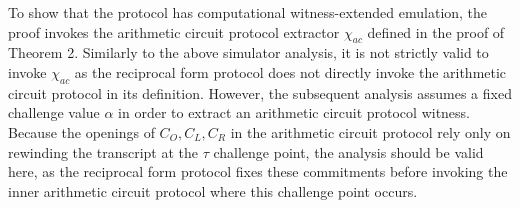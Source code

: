 \documentclass{article}
\begin{document}
To show that the protocol has computational witness-extended emulation, the proof invokes the arithmetic circuit protocol extractor $\chi_{ac}$ defined in the proof of Theorem 2.
Similarly to the above simulator analysis, it is not strictly valid to invoke $\chi_{ac}$ as the reciprocal form protocol does not directly invoke the arithmetic circuit protocol in its definition.
However, the subsequent analysis assumes a fixed challenge value $\alpha$ in order to extract an arithmetic circuit protocol witness.
Because the openings of $C_O, C_L, C_R$ in the arithmetic circuit protocol rely only on rewinding the transcript at the $\tau$ challenge point, the analysis should be valid here, as the reciprocal form protocol fixes these commitments before invoking the inner arithmetic circuit protocol where this challenge point occurs.
\end{document}
